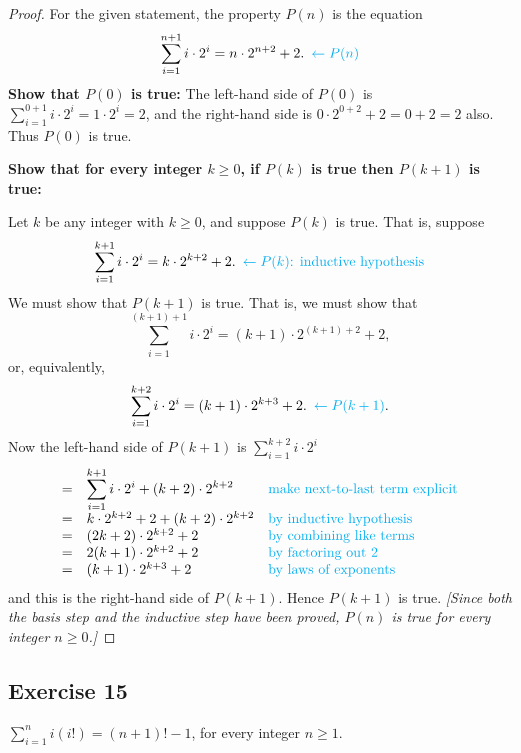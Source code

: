 \documentclass[14pt]{extarticle}
\newcommand{\dps}{\displaystyle}
\newcommand{\from}{\leftarrow}
\newcommand{\cy}{\color{cyan}}
\begin{document}
\begin{proof}
For the given statement, the property $P(n)$ is the equation
\[
\dps \sum_{i=1}^{n+1}i \cdot 2^i = n \cdot 2^{n+2} + 2. \,\,\, {\cy \from P(n)}
\]
{\bf Show that $P(0)$ is true:} The left-hand side of $P(0)$ is $\dps \sum_{i=1}^{0+1}i \cdot 2^i = 1 \cdot 2^i = 2$, and the right-hand side is $0 \cdot 2^{0+2} + 2 = 0 + 2 = 2$ also. Thus $P(0)$ is true.

{\bf Show that for every integer $k \geq 0$, if $P(k)$ is true then $P(k + 1)$ is true:}

Let $k$ be any integer with $k \geq 0$, and suppose $P(k)$ is true. That is, suppose
\[
\dps \sum_{i=1}^{k+1}i \cdot 2^i = k \cdot 2^{k+2} + 2. \,\,\, {\cy \from P(k) \text{: inductive hypothesis}}
\]
We must show that $P(k + 1)$ is true. That is, we must show that
\[
\dps \sum_{i=1}^{(k+1)+1}i \cdot 2^i = (k+1) \cdot 2^{(k+1) +2} + 2,
\]
or, equivalently,
\[
\dps \sum_{i=1}^{k+2}i \cdot 2^i = (k+1) \cdot 2^{k+3} + 2. \,\,\,{\cy \from P(k+1)}.
\]
Now the left-hand side of $P(k + 1)$ is $\sum_{i=1}^{k+2}i \cdot 2^i$
\[
\begin{array}{lll}
= & \dps \sum_{i=1}^{k+1}i \cdot 2^i + (k+2) \cdot 2^{k+2} & \text{\cy make next-to-last term explicit} \\
= & k \cdot 2^{k+2} + 2 + (k+2) \cdot 2^{k+2} & \text{\cy by inductive hypothesis} \\
= & (2k+2) \cdot 2^{k+2} + 2 & \text{\cy by combining like terms} \\
= & 2(k+1) \cdot 2^{k+2} + 2 & \text{\cy by factoring out 2} \\
= & (k+1) \cdot 2^{k+3} + 2 & \text{\cy by laws of exponents} 
\end{array}
\]
and this is the right-hand side of $P(k + 1)$. Hence $P(k + 1)$ is true. {\it [Since both the basis step and the inductive step have been proved, $P(n)$ is true for every integer $n \geq 0$.]}
\end{proof}

\subsection{Exercise 15}
$\dps \sum_{i=1}^{n}i(i!) = (n+1)! - 1$, for every integer $n \geq 1$.
\end{document}
